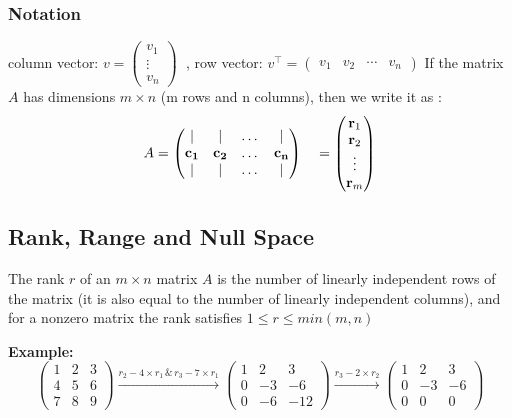 \documentclass{article}
\begin{document}
\subsubsection{Notation}
	column vector: $ v = \begin{pmatrix} v_1 \\ \vdots \\ v_n \end{pmatrix} \;$ , 
	row vector: $v^\top = \begin{pmatrix} v_1 & v_2 & \cdots & v_n \end{pmatrix} $
		\newline 
		If the matrix $A$ has dimensions $ m \times n $ (m rows and n columns), then we write it as : 
\[
A = \begin{pmatrix}
    \vert & \vert & \dots & \vert \\
    \mathbf{c_1} & \mathbf{c_2} & \dots & \mathbf{c_n} \\
    \vert & \vert & \dots & \vert
\end{pmatrix}
\quad=
\begin{pmatrix}
    \text{\textbf{r}}_1 \\
    \text{\textbf{r}}_2 \\
    \vdots \\
    \text{\textbf{r}}_m
\end{pmatrix}
\]
\subsection{Rank, Range and Null Space}
\begin{tcolorbox}[colback=seashell,colframe=beaublue,title=Rank]	
	The rank $r$ of an $ m \times n $  matrix $A$ is the number of linearly independent rows of
the matrix (it is also equal to the number of linearly independent columns), and
			 for a nonzero matrix the rank satisfies $ 1 \leq r \leq min(m,n) $
\end{tcolorbox}
			
			 \textbf{Example: } 
	 $$
		 \begin{pmatrix} 1 & 2 & 3 \\ 4 & 5 & 6 \\ 7 & 8 & 9 \end{pmatrix}  
			 \xrightarrow{r_2 - 4 \times r_1 \, \& \, r_3 - 7 \times r_1}
\begin{pmatrix} 1 & 2 & 3 \\ 0 & -3 & -6 \\ 0 & -6 & -12 \end{pmatrix}  
				\xrightarrow{r_3 - 2 \times r_2}
\begin{pmatrix} 1 & 2 & 3 \\ 0 & -3 & -6 \\ 0 & 0 & 0 \end{pmatrix}  
				 $$
				 
\end{document}
